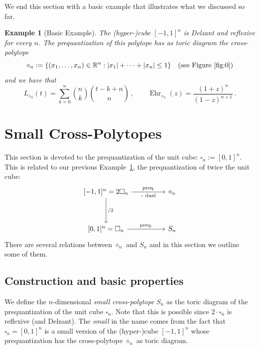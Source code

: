 \documentclass[a4paper,11pt,reqno]{amsart}
\DeclareMathOperator{\Ehr}{Ehr}
\newtheorem{example}[theorem]{Example}
\begin{document}
We end this section with a basic example that illustrates what we discussed so far.
\begin{example}[Basic Example] \label{ex:hcube}
The (hyper-)cube $[-1, 1]^n$ is Delzant and reflexive for every $n$. The prequantization of this polytope 
has as toric diagram the cross-polytope 
\[
\diamond_n := \{(x_1, \ldots, x_n) \in \mathbb{R}^n : |x_1|+ \cdots +|x_n| \leq 1\} \quad\text{(see Figure~\ref{fig:0})}
\]
and we have that
\[
 L_{\diamond_n} (t) = \sum_{k=0}^{n} {n\choose k} {t-k+n \choose n}\,,\qquad
 \Ehr_{\diamond_n} (z) = \frac{(1+z)^n}{(1-z)^{n+1}} \,.
\]
\end{example}

\section{Small Cross-Polytopes}
\label{sec:smallcrosspolytopes}

This section is devoted to the prequantization of the unit cube: $\square_n := [0,1]^n$. 
This is related to our previous Example~\ref{ex:hcube}, the prequantization of twice the 
unit cube:
\[\begin{tikzcd}
	{[-1,1]^n=2\square_n} && {\diamond_n} \\
	\\
	{[0,1]^n=\square_n} && {S_n}
	\arrow["{\text{preq.}}", "{\text{- dual}}"', from=1-1, to=1-3]
	\arrow["{/2}", from=1-1, to=3-1]
	\arrow["{\text{preq.}}", from=3-1, to=3-3]
\end{tikzcd}\]
\noindent There are several relations between $\diamond_n$ and $S_n$ and in this section we outline 
some of them.

\subsection{Construction and basic properties} \label{ssec:smallcrosspolytopes}

We define the $n$-dimensional \emph{small cross-polytope} $S_n$ as the toric diagram of the prequantization 
of the unit cube $\square_n$. Note that this is possible since $2 \cdot \square_n$ is reflexive (and Delzant). 
The \emph{small} in the name comes from the fact that $\square_n = [0,1]^n$ is a small version of the 
(hyper-)cube $[-1, 1]^n$ whose prequantization has the cross-polytope $\diamond_n$ as toric diagram.
\end{document}
